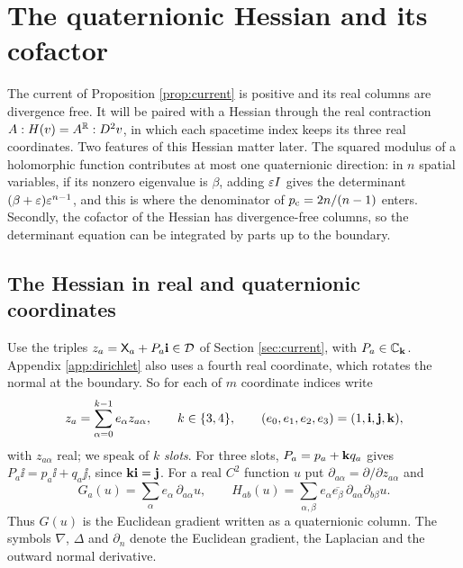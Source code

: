 \section{The quaternionic Hessian and its cofactor}\label{sec:hessian}

The current of Proposition \ref{prop:current} is positive and its real columns are
divergence free. It will be paired with a Hessian through the real contraction
$A:H(v)=A^{\mathbb{R}}:D^2v$, in which each spacetime index keeps its three real coordinates. Two
features of this Hessian matter later. The squared modulus of a holomorphic function
contributes at most one quaternionic direction: in $n$ spatial variables, if its nonzero
eigenvalue is $\beta$, adding $\varepsilon I$ gives the determinant $(\beta+\varepsilon)\varepsilon^{n-1}$, and this
is where the denominator of $p_{\mathrm c}=2n/(n-1)$ enters. Secondly, the cofactor of the Hessian has
divergence-free columns, so the determinant equation can be integrated by parts up to the
boundary.

\subsection{The Hessian in real and quaternionic coordinates}\label{ssec:hessian}
Use the triples $z_a=\mathsf X_a+P_a\mathbf i\in\mathcal D$ of Section \ref{sec:current}, with $P_a\in\mathbb{C}_{\mathbf k}$.
Appendix \ref{app:dirichlet} also uses a fourth real coordinate, which rotates the normal at
the boundary. So for each of $m$ coordinate indices write
\[
z_a=\sum_{\alpha=0}^{k-1}e_\alpha z_{a\alpha},\qquad k\in\{3,4\},\qquad
(e_0,e_1,e_2,e_3)=(1,\mathbf i,\mathbf j,\mathbf k),
\]
with $z_{a\alpha}$ real; we speak of $k$ \emph{slots}. For three slots,
$P_a=p_a+\mathbf k q_a$ gives $P_a\ii=p_a\ii+q_a\jj$, since $\mathbf k\mathbf i=\mathbf j$. For a real $C^2$ function
$u$ put $\partial_{a\alpha}=\partial/\partial z_{a\alpha}$ and
\begin{equation}\label{eq:GH}
G_a(u)=\sum_\alpha e_\alpha\,\partial_{a\alpha}u,\qquad
H_{ab}(u)=\sum_{\alpha,\beta}e_\alpha\overline{e_\beta}\,\partial_{a\alpha}\partial_{b\beta}u .
\end{equation}
Thus $G(u)$ is the Euclidean gradient written as a quaternionic column. The symbols $\nabla$,
$\Delta$ and $\partial_n$ denote the Euclidean gradient, the Laplacian and the outward normal
derivative.

